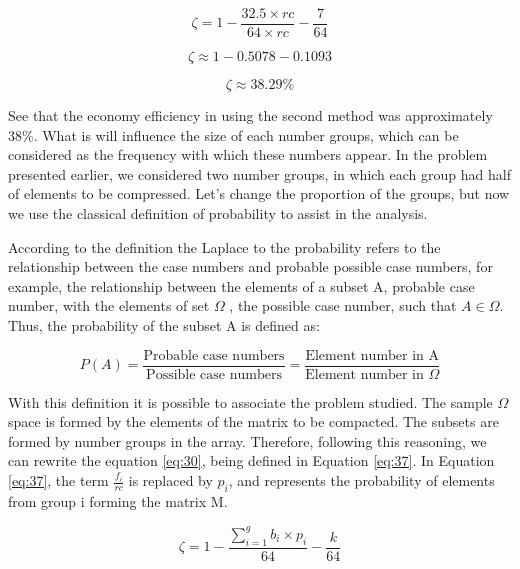 \documentclass[10pt]{article}
\begin{document}
\begin{equation} \label{eq:34}
 \zeta = 1 - \frac{  32.5  \times rc }{64 \times rc} - \frac{7}{64} 
\end{equation}

\begin{equation} \label{eq:35}
 \zeta \approx 1 - 0.5078 - 0.1093
\end{equation}

\begin{equation} \label{eq:36}
 \zeta \approx 38.29\%
\end{equation}

See that the economy efficiency in using the second method was approximately 38\%. What is will influence the size of each number groups, which can be considered as the frequency with which these numbers appear. In the problem presented earlier, we considered two number groups, in which each group had half of elements to be compressed. Let's change the proportion of the groups, but now we use the classical definition of probability to assist in the analysis.

According to the definition the Laplace to the probability refers to the relationship between the case numbers and probable possible case numbers, for example, the relationship between the elements of a subset A,  probable case number, with the elements of set $\Omega$ , the possible case number, such that $A \in \Omega$. Thus, the probability of the subset A is defined as:

\begin{equation}
 P(A) = \frac{\text{Probable case numbers}}{\text{Possible case numbers}} = \frac{\text{Element number in A}}{\text{Element number in }\Omega}
\end{equation}

With this definition it is possible to associate the problem studied. The sample $\Omega$ space is formed by the elements of the matrix to be compacted. The subsets are formed by number groups in the array. Therefore, following this reasoning, we can rewrite the equation \ref{eq:30}, being defined in Equation \ref{eq:37}. In Equation \ref{eq:37}, the term $\frac{f_i}{rc}$ is replaced by $p_i$, and represents the probability of elements from group i forming the matrix M.

\begin{equation}\label{eq:37}
 \zeta = 1 - \frac{\sum_{i=1}^{g}  b_i \times p_i }{64} - \frac{k}{64} 
\end{equation}
\end{document}
